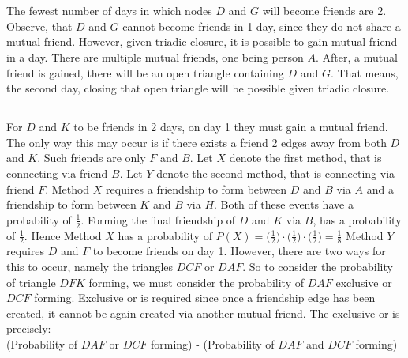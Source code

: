 \documentclass[12pt]{article}
\begin{document}
\newpage
\section{}
\subsection{}
The fewest number of days in which nodes $D$ and $G$ will become friends are 2. Observe, that $D$ and $G$ cannot become friends in 1 day, since they do not share a mutual friend. However, given triadic closure, it is possible to gain mutual friend in a day. There are multiple mutual friends, one being person $A$. After, a mutual friend is gained, there will be an open triangle containing $D$ and $G$. That means, the second day, closing that open triangle will be possible given triadic closure.  
\subsection{}
For $D$ and $K$ to be friends in 2 days, on day 1 they must gain a mutual friend. The only way this may occur is if there exists a friend 2 edges away from both $D$ and $K$. Such friends are only $F$ and $B$. Let $X$ denote the first method, that is connecting via friend $B$. Let $Y$ denote the second method, that is connecting via friend $F$. 
\newline 
\newline 
Method $X$ requires a friendship to form between $D$ and $B$ via $A$ and a friendship to form between $K$ and $B$ via $H$. Both of these events have a probability of $\frac{1}{2}$. Forming the final friendship of $D$ and $K$ via $B$, has a probability of $\frac{1}{2}$. Hence Method $X$ has a probability of $P(X) = \big ( \frac{1}{2} \big ) \cdot \big ( \frac{1}{2} \big ) \cdot \big ( 
 \frac{1}{2} \big ) = \frac{1}{8}$
\newline 
\newline 
Method $Y$ requires $D$ and $F$ to become friends on day 1. However, there are two ways for this to occur, namely the triangles $DCF$ or $DAF$. So to consider the probability of triangle $DFK$ forming, we must consider the probability of $DAF$ exclusive or $DCF$ forming. Exclusive or is required since once a friendship edge has been created, it cannot be again created via another mutual friend. The exclusive or is precisely: \\
(Probability of $DAF$ or $DCF$ forming) - (Probability of $DAF$ and $DCF$ forming)
\\
\\
\end{document}
